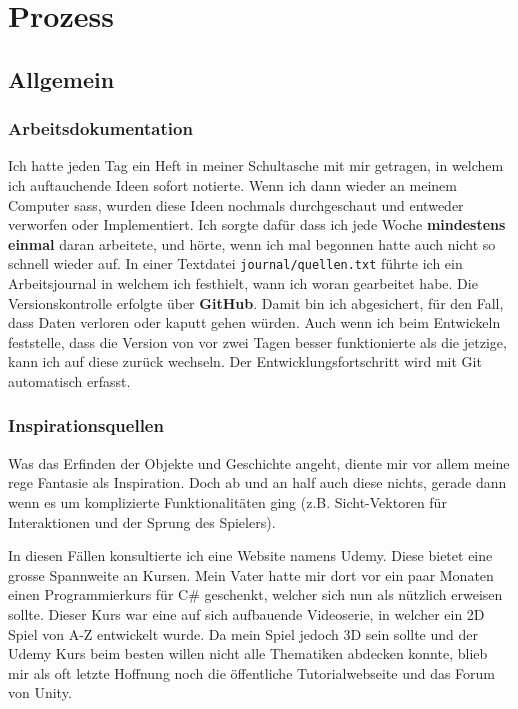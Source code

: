 \chapter{Prozess}

\section{Allgemein}

\subsection{Arbeitsdokumentation} 

Ich hatte jeden Tag ein Heft in meiner Schultasche mit mir getragen, in welchem ich auftauchende Ideen sofort notierte.
Wenn ich dann wieder an meinem Computer sass, wurden diese Ideen nochmals durchgeschaut und entweder verworfen oder Implementiert.
Ich sorgte dafür dass ich jede Woche \textbf{mindestens einmal} daran arbeitete, und hörte, wenn ich mal begonnen hatte auch nicht so schnell wieder auf.
In einer Textdatei \lstinline{journal/quellen.txt} führte ich ein Arbeitsjournal in welchem ich festhielt, wann ich woran gearbeitet habe.
Die Versionskontrolle erfolgte über \textbf{GitHub}. Damit bin ich abgesichert, für den Fall, dass Daten verloren oder kaputt gehen würden. Auch wenn ich beim Entwickeln feststelle, dass die Version von vor zwei Tagen besser funktionierte als die jetzige, kann ich auf diese zurück wechseln.
Der Entwicklungsfortschritt wird mit Git automatisch erfasst.

\subsection{Inspirationsquellen}
Was das Erfinden der Objekte und Geschichte angeht, diente mir vor allem meine rege Fantasie als Inspiration.
Doch ab und an half auch diese nichts, gerade dann wenn es um komplizierte Funktionalitäten ging (z.B. Sicht-Vektoren für Interaktionen und der Sprung des Spielers).

In diesen Fällen konsultierte ich eine Website namens Udemy. Diese bietet eine grosse Spannweite an Kursen. Mein Vater hatte mir dort vor ein paar Monaten einen Programmierkurs für C\# geschenkt, welcher sich nun als nützlich erweisen sollte.
Dieser Kurs war eine auf sich aufbauende Videoserie, in welcher ein 2D Spiel von A-Z entwickelt wurde.
Da mein Spiel jedoch 3D sein sollte und der Udemy Kurs beim besten willen nicht alle Thematiken abdecken konnte, blieb mir als oft letzte Hoffnung noch die öffentliche Tutorialwebseite und das Forum von Unity. 


